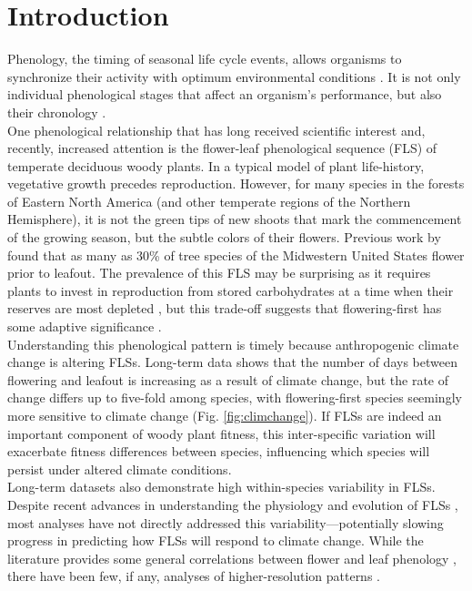 \documentclass[11pt]{article}
\begin{document}
\section*{Introduction}
Phenology, the timing of seasonal life cycle events, allows organisms to synchronize their activity with optimum environmental conditions \citep{Forrest2010}. It is not only individual phenological stages that affect an organism's performance, but also their chronology \citep{Firmat2017,Vitasse2010,Ettinger2018}.\\

\noindent One phenological relationship that has long received scientific interest \citep[see][]{Robertson1895} and, recently, increased attention \citep[e.g.][]{Savage2019, Gougherty2018} is the flower-leaf phenological sequence (FLS) of temperate deciduous woody plants. In a typical model of plant life-history, vegetative growth precedes reproduction. However, for many species in the forests of Eastern North America (and other temperate regions of the Northern Hemisphere), it is not the green tips of new shoots that mark the commencement of the growing season, but the subtle colors of their flowers. Previous work by \citet{Gougherty2018} found that as many as 30\% of tree species of the Midwestern United States flower prior to leafout. The prevalence of this FLS may be surprising as it requires plants to invest in reproduction from stored carbohydrates at a time when their reserves are most depleted \citep{Primack1987}, but this trade-off suggests that flowering-first has some adaptive significance \citep{Rathcke_1985}.\\

\noindent Understanding this phenological pattern is timely because anthropogenic climate change is altering FLSs. Long-term data shows that the number of days between flowering and leafout is increasing as a result of climate change, but the rate of change differs up to five-fold among species, with flowering-first species seemingly more sensitive  to climate change (Fig. \ref{fig:climchange}). If FLSs are indeed an important component of woody plant fitness, this inter-specific variation will exacerbate fitness differences between species, influencing which species will persist under altered climate conditions.\\ 

\noindent Long-term datasets also demonstrate high within-species variability in FLSs. Despite recent advances in understanding the physiology and evolution of FLSs \citep{Gougherty2018,Savage2019}, most analyses have not directly addressed this variability---potentially slowing progress in predicting how FLSs will respond to climate change. While the literature provides some general correlations between flower and leaf phenology \citep[e.g.][]{Lechowicz_1995, Ettinger2018}, there have been few, if any, analyses of higher-resolution patterns \citep{Gougherty2018}. \\
\end{document}
